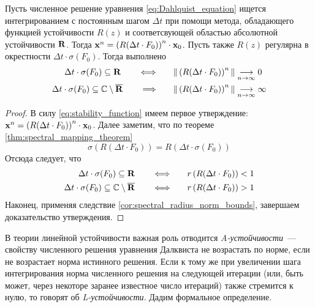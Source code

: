 \begin{statement}
    \label{stat:linear_numerical_stability}
    Пусть численное решение уравнения \eqref{eq:Dahlquist_equation} ищется интегрированием с постоянным шагом $ \Delta t $
    при помощи метода, обладающего функцией устойчивости $ R(z) $ и соответсвующей областью абсолютной устойчивости $ \mathbf{R} $.
    Тогда $ \mathbf{x}^n = \left( R(\Delta t \cdot F_0) \right)^n \cdot \mathbf{x}_0 $.
    Пусть также $ R(z) $ регулярна в окрестности $ \Delta t \cdot \sigma(F_0) $.
    Тогда выполнено
    \begin{align}
        \Delta t \cdot \sigma(F_0) \subseteq \mathbf{R} \qquad \Longleftrightarrow \qquad & \| \left( R(\Delta t \cdot F_0) \right)^n \| \underset{n \to \infty}{\longrightarrow} 0 \\
        \Delta t \cdot \sigma(F_0) \subseteq \mathbb{C} \setminus \overline{\mathbf{R}} \qquad \Longrightarrow \qquad & \| \left( R(\Delta t \cdot F_0) \right)^n \| \underset{n \to \infty}{\longrightarrow} \infty
    \end{align}
\end{statement}

\begin{proof}
    В силу \eqref{eq:stability_function} имеем первое утверждение: $ \mathbf{x}^n = \left( R(\Delta t \cdot F_0) \right)^n \cdot \mathbf{x}_0 $.
    Далее заметим, что по теореме \ref{thm:spectral_mapping_theorem}
    \[
        \sigma\left( R(\Delta t \cdot F_0) \right) = R\left( \Delta t \cdot \sigma(F_0) \right)
    \]
    Отсюда следует, что
    \begin{align}
        \Delta t \cdot \sigma(F_0) \subseteq \mathbf{R} \qquad \Longleftrightarrow \qquad & r\left( R(\Delta t \cdot F_0) \right) < 1 \\
        \Delta t \cdot \sigma(F_0) \subseteq \mathbb{C} \setminus \overline{\mathbf{R}} \qquad \Longleftrightarrow \qquad & r\left( R(\Delta t \cdot F_0) \right) > 1
    \end{align}
    Наконец, применяя следствие \ref{cor:spectral_radius_norm_bounds}, завершаем доказательство утверждения.
\end{proof}

В теории линейной устойчивости важная роль отводится \emph{A-устойчивости}~--- свойству численного решения уравнения Далквиста не возрастать по норме,
если не возрастает норма истинного решения.
Если к тому же при увеличении шага интегрирования норма численного решения на следующей итерации (или, быть может, через некоторе заранее известное число итераций)
также стремится к нулю, то говорят об \emph{L-устойчивости}.
Дадим формальное определение.

